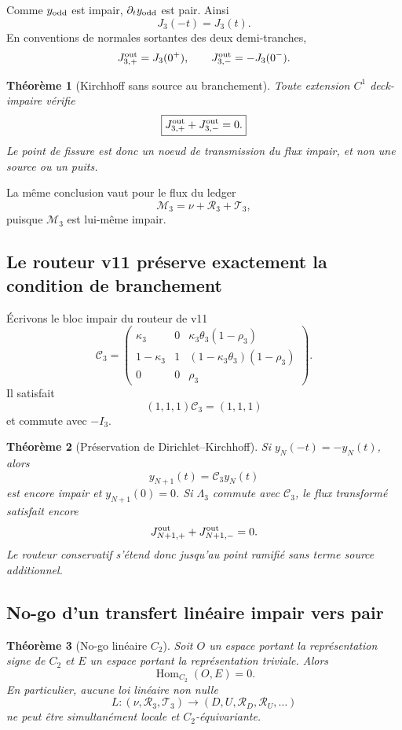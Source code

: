 \documentclass[11pt,a4paper]{article}
\newtheorem{theorem}{Théorème}[section]
\begin{document}
Comme $y_{\rm odd}$ est impair, $\partial_t y_{\rm odd}$ est pair. Ainsi
\[
 J_3(-t)=J_3(t).
\]
En conventions de normales sortantes des deux demi-tranches,
\[
 J_{3,+}^{\rm out}=J_3(0^+),
 \qquad
 J_{3,-}^{\rm out}=-J_3(0^-).
\]

\begin{theorem}[Kirchhoff sans source au branchement]\label{thm:v19-kirchhoff}
Toute extension $C^1$ deck-impaire vérifie
\[
 \boxed{
 J_{3,+}^{\rm out}
 +
 J_{3,-}^{\rm out}
 =0.}
\]
Le point de fissure est donc un noeud de transmission du flux impair, et non une source ou un puits.
\end{theorem}

La même conclusion vaut pour le flux du ledger
\[
 \mathcal M_3
 =
 \nu+\mathscr R_3+\mathscr T_3,
\]
puisque $\mathcal M_3$ est lui-même impair.

\subsection{Le routeur v11 préserve exactement la condition de branchement}

Écrivons le bloc impair du routeur de v11
\[
 \mathcal C_3
 =
 \begin{pmatrix}
 \kappa_3&0&\kappa_3\theta_3(1-\rho_3)\\
 1-\kappa_3&1&(1-\kappa_3\theta_3)(1-\rho_3)\\
 0&0&\rho_3
 \end{pmatrix}.
\]
Il satisfait
\[
 (1,1,1)\mathcal C_3=(1,1,1)
\]
et commute avec $-I_3$.

\begin{theorem}[Préservation de Dirichlet--Kirchhoff]\label{thm:v19-router-branch}
Si $y_N(-t)=-y_N(t)$, alors
\[
 y_{N+1}(t)=\mathcal C_3y_N(t)
\]
est encore impair et $y_{N+1}(0)=0$. Si $\Lambda_3$ commute avec $\mathcal C_3$, le flux transformé satisfait encore
\[
 J_{N+1,+}^{\rm out}+J_{N+1,-}^{\rm out}=0.
\]
Le routeur conservatif s'étend donc jusqu'au point ramifié sans terme source additionnel.
\end{theorem}

\subsection{No-go d'un transfert linéaire impair vers pair}

\begin{theorem}[No-go linéaire $C_2$]\label{thm:v19-linear-nogo}
Soit $O$ un espace portant la représentation signe de $C_2$ et $E$ un espace portant la représentation triviale. Alors
\[
 \boxed{
 \operatorname{Hom}_{C_2}(O,E)=0.}
\]
En particulier, aucune loi linéaire non nulle
\[
 L:
 (\nu,\mathscr R_3,\mathscr T_3)
 \longrightarrow
 (D,U,\mathscr R_D,\mathscr R_U,\ldots)
\]
ne peut être simultanément locale et $C_2$-équivariante.
\end{theorem}
\end{document}
